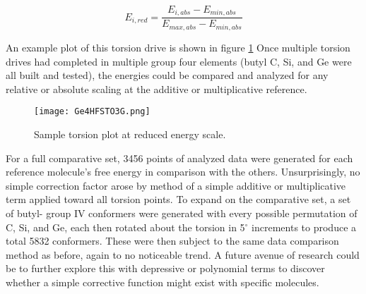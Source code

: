 \begin{equation}
E_{i, red} = \frac{E_{i,abs} - E_{min,abs}}{E_{max,abs}-E_{min,abs}}
\label{eq:TorsionReducedScale}
\end{equation}

An example plot of this torsion drive is shown in figure \ref{fig:EXTorsion} Once multiple torsion drives had completed in multiple group four elements (butyl C, Si, and Ge were all built and tested), the energies could be compared and analyzed for any relative or absolute scaling at the additive or multiplicative reference. 

\begin{figure}
	
	\centering
	
	\texttt{[image: Ge4HFSTO3G.png]}
	
	\caption{Sample torsion plot at reduced energy scale.}
	
	\label{fig:EXTorsion}
	
\end{figure}

For a full comparative set, 3456 points of analyzed data were generated for each reference molecule's free energy in comparison with the others. 
Unsurprisingly, no simple correction factor arose by method of a simple additive or multiplicative term applied toward all torsion points. 
To expand on the comparative set, a set of butyl- group IV conformers were generated with every possible permutation of C, Si, and Ge, each then rotated about the torsion in 5$^{\circ}$ increments to produce a total 5832 conformers.
These were then subject to the same data comparison method as before, again to no noticeable trend.
A future avenue of research could be to further explore this with depressive or polynomial terms to discover whether a simple corrective function might exist with specific molecules.

